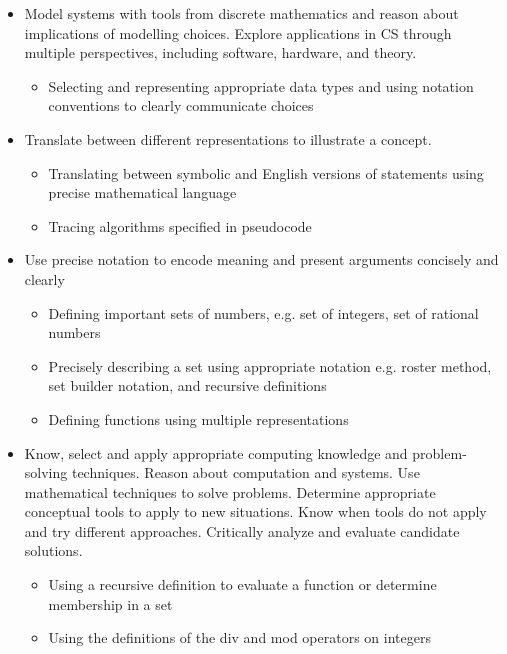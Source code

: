 \begin{itemize}
\item Model systems with tools from discrete mathematics and reason about implications of modelling choices. Explore applications in CS through multiple perspectives, including software, hardware, and theory.
\begin{itemize}

   \item Selecting and representing appropriate data types and using notation conventions to clearly communicate choices

\end{itemize}

\item Translate between different representations to illustrate a concept.

\begin{itemize}
   \item Translating between symbolic and English versions of statements using precise mathematical language
   \item Tracing algorithms specified in pseudocode
\end{itemize}


\item Use precise notation to encode meaning and present arguments concisely and clearly
\begin{itemize}
    \item Defining important sets of numbers, e.g. set of integers, set of rational numbers
    \item Precisely describing a set using appropriate notation e.g. roster method, set builder notation, and recursive definitions
    \item Defining functions using multiple representations
\end{itemize}

\item Know, select and apply appropriate computing knowledge and problem-solving techniques. Reason about computation and systems. Use mathematical techniques to solve problems. Determine appropriate conceptual tools to apply to new situations. Know when tools do not apply and try different approaches. Critically analyze and evaluate candidate solutions.
\begin{itemize}
    \item Using a recursive definition to evaluate a function or determine membership in a set
    \item  Using the definitions of the div and mod operators on integers

\end{itemize}

\end{itemize}

